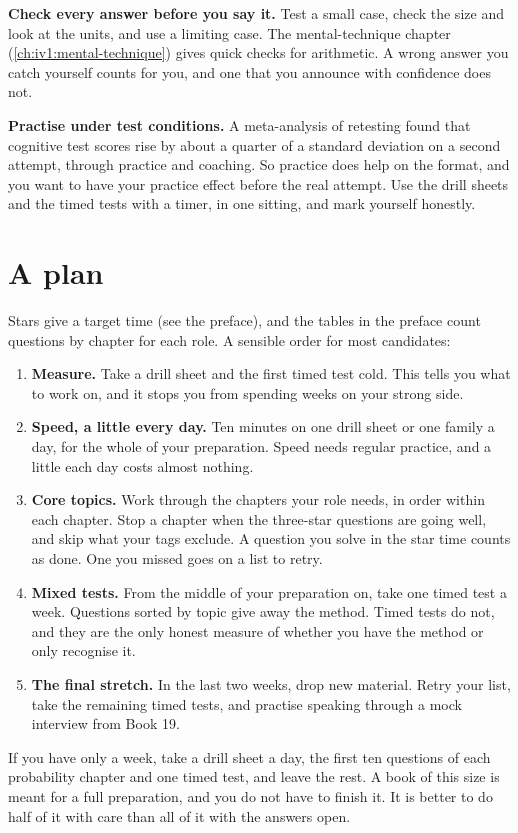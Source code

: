 \textbf{Check every answer before you say it.} Test a small case, check the size and look at the units, and use a limiting case. The mental-technique chapter (\cref{ch:iv1:mental-technique}) gives quick checks for arithmetic. A wrong answer you catch yourself counts for you, and one that you announce with confidence does not.

\textbf{Practise under test conditions.} A meta-analysis of retesting found that cognitive test scores rise by about a quarter of a standard deviation on a second attempt, through practice and coaching. So practice does help on the format, and you want to have your practice effect before the real attempt. Use the drill sheets and the timed tests with a timer, in one sitting, and mark yourself honestly.

\section{A plan}

Stars give a target time (see the preface), and the tables in the preface count questions by chapter for each role. A sensible order for most candidates:

\begin{enumerate}
\item \textbf{Measure.} Take a drill sheet and the first timed test cold. This tells you what to work on, and it stops you from spending weeks on your strong side.
\item \textbf{Speed, a little every day.} Ten minutes on one drill sheet or one family a day, for the whole of your preparation. Speed needs regular practice, and a little each day costs almost nothing.
\item \textbf{Core topics.} Work through the chapters your role needs, in order within each chapter. Stop a chapter when the three-star questions are going well, and skip what your tags exclude. A question you solve in the star time counts as done. One you missed goes on a list to retry.
\item \textbf{Mixed tests.} From the middle of your preparation on, take one timed test a week. Questions sorted by topic give away the method. Timed tests do not, and they are the only honest measure of whether you have the method or only recognise it.
\item \textbf{The final stretch.} In the last two weeks, drop new material. Retry your list, take the remaining timed tests, and practise speaking through a mock interview from Book 19.
\end{enumerate}

If you have only a week, take a drill sheet a day, the first ten questions of each probability chapter and one timed test, and leave the rest. A book of this size is meant for a full preparation, and you do not have to finish it. It is better to do half of it with care than all of it with the answers open.

